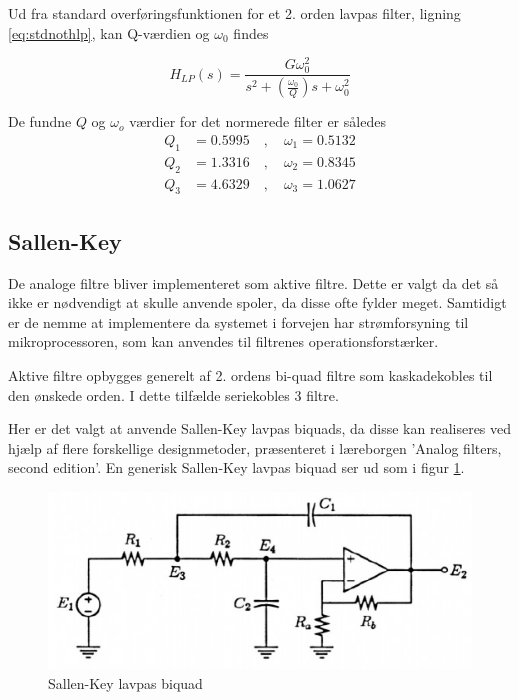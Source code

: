 Ud fra standard overføringsfunktionen for et 2. orden lavpas filter, ligning \ref{eq:stdnothlp}, kan Q-værdien og $\omega_0$ findes 

\begin{equation}
\label{eq:stdnothlp}
H_{LP}(s) = \frac{G\omega_0^2}{s^2 + \left(\frac{\omega_0}{Q}\right)s + \omega_0^2}
\end{equation}

De fundne $Q$ og $\omega_o$ værdier for det normerede filter er således
\begin{align}
	Q_1 &= \num{0.5995} \quad , \quad \omega_1= \num{0.5132} \nonumber \\
	Q_2 &= \num{1.3316} \quad , \quad \omega_2= \num{0.8345} \nonumber \\
	Q_3 &= \num{4.6329} \quad , \quad \omega_3= \num{1.0627} \label{eq:q_and_w_norm}
\end{align}

\subsection{Sallen-Key}

De analoge filtre bliver implementeret som aktive filtre. Dette er valgt da det så ikke er nødvendigt at skulle anvende spoler, da disse ofte fylder meget.
Samtidigt er de nemme at implementere da systemet i forvejen har strømforsyning til mikroprocessoren, som kan anvendes til filtrenes operationsforstærker.

Aktive filtre opbygges generelt af 2. ordens bi-quad filtre som kaskadekobles til den ønskede orden.
I dette tilfælde seriekobles 3 filtre. 


Her er det valgt at anvende Sallen-Key lavpas biquads,
da disse kan realiseres ved hjælp af flere forskellige designmetoder, præsenteret 
i læreborgen 'Analog filters, second edition'\cite{KendallSu}.
En generisk Sallen-Key lavpas biquad ser ud som i figur \ref{fig:sklpbq}.

\begin{figure}[H]
	\centering
	\includegraphics[width=.6\textwidth]{billeder/sklpbq}
	\caption{Sallen-Key lavpas biquad \cite{KendallSu}}
	\label{fig:sklpbq}
\end{figure}

